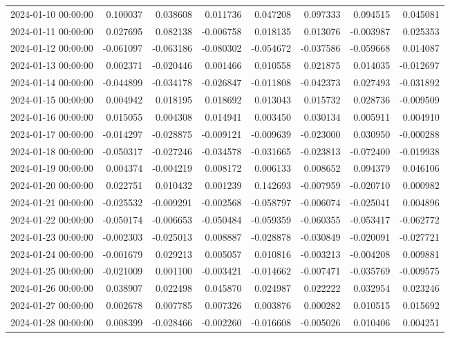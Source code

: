\begin{tabular}{lrrrrrrr}
2024-01-10 00:00:00 & 0.100037 & 0.038608 & 0.011736 & 0.047208 & 0.097333 & 0.094515 & 0.045081 \\
2024-01-11 00:00:00 & 0.027695 & 0.082138 & -0.006758 & 0.018135 & 0.013076 & -0.003987 & 0.025353 \\
2024-01-12 00:00:00 & -0.061097 & -0.063186 & -0.080302 & -0.054672 & -0.037586 & -0.059668 & 0.014087 \\
2024-01-13 00:00:00 & 0.002371 & -0.020446 & 0.001466 & 0.010558 & 0.021875 & 0.014035 & -0.012697 \\
2024-01-14 00:00:00 & -0.044899 & -0.034178 & -0.026847 & -0.011808 & -0.042373 & 0.027493 & -0.031892 \\
2024-01-15 00:00:00 & 0.004942 & 0.018195 & 0.018692 & 0.013043 & 0.015732 & 0.028736 & -0.009509 \\
2024-01-16 00:00:00 & 0.015055 & 0.004308 & 0.014941 & 0.003450 & 0.030134 & 0.005911 & 0.004910 \\
2024-01-17 00:00:00 & -0.014297 & -0.028875 & -0.009121 & -0.009639 & -0.023000 & 0.030950 & -0.000288 \\
2024-01-18 00:00:00 & -0.050317 & -0.027246 & -0.034578 & -0.031665 & -0.023813 & -0.072400 & -0.019938 \\
2024-01-19 00:00:00 & 0.004374 & -0.004219 & 0.008172 & 0.006133 & 0.008652 & 0.094379 & 0.046106 \\
2024-01-20 00:00:00 & 0.022751 & 0.010432 & 0.001239 & 0.142693 & -0.007959 & -0.020710 & 0.000982 \\
2024-01-21 00:00:00 & -0.025532 & -0.009291 & -0.002568 & -0.058797 & -0.006074 & -0.025041 & 0.004896 \\
2024-01-22 00:00:00 & -0.050174 & -0.006653 & -0.050484 & -0.059359 & -0.060355 & -0.053417 & -0.062772 \\
2024-01-23 00:00:00 & -0.002303 & -0.025013 & 0.008887 & -0.028878 & -0.030849 & -0.020091 & -0.027721 \\
2024-01-24 00:00:00 & -0.001679 & 0.029213 & 0.005057 & 0.010816 & -0.003213 & -0.004208 & 0.009881 \\
2024-01-25 00:00:00 & -0.021009 & 0.001100 & -0.003421 & -0.014662 & -0.007471 & -0.035769 & -0.009575 \\
2024-01-26 00:00:00 & 0.038907 & 0.022498 & 0.045870 & 0.024987 & 0.022222 & 0.032954 & 0.023246 \\
2024-01-27 00:00:00 & 0.002678 & 0.007785 & 0.007326 & 0.003876 & 0.000282 & 0.010515 & 0.015692 \\
2024-01-28 00:00:00 & 0.008399 & -0.028466 & -0.002260 & -0.016608 & -0.005026 & 0.010406 & 0.004251 \\

\end{tabular}
